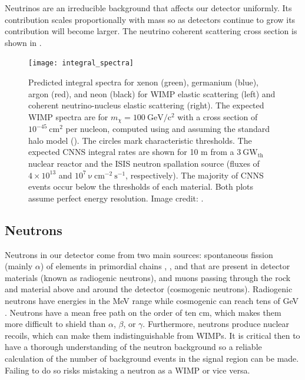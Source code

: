 Neutrinos are an irreducible background that affects our detector uniformly.  Its contribution scales proportionally with mass so as
detectors continue to grow its contribution will become larger.  The neutrino coherent scattering cross section is shown in
.

\begin{figure}
\centering
\texttt{[image: integral\_spectra]}
\caption{Predicted integral spectra for xenon (green), germanium (blue), argon (red), and neon (black) for WIMP elastic scattering (left)
and coherent neutrino-nucleus elastic scattering (right).  The expected WIMP spectra are for $m_{\chi} = 100\ \mathrm{GeV/c^2}$ with a
cross section of $10^{-45}\ \mathrm{cm^2}$ per nucleon, computed using  and assuming the standard halo model
().  The circles mark
characteristic thresholds.  The expected CNNS integral rates are shown for 10 m from a $3\ \mathrm{GW_{th}}$ nuclear
reactor and the ISIS neutron spallation source  (fluxes of
$4 \times 10^{13}$ and $10^{7}\ \mathrm{\nu\ cm^{-2}\ s^{-1}}$, respectively).  The majority of CNNS events occur below the
thresholds of each material.  Both plots assume perfect energy resolution.  Image credit:
.}
\label{fig:neutrinos_integral_spectra}
\end{figure}


\subsection{Neutrons}
\label{subsec:neutrons}
Neutrons in our detector come from two main sources: spontaneous fission (mainly $\alpha$) of elements in primordial chains
\uranium, , and  that are present in detector materials (known as radiogenic neutrons), and muons
passing through the rock and material above and around the detector (cosmogenic neutrons).  Radiogenic neutrons have energies in the MeV
range
while cosmogenic can reach tens of GeV .  Neutrons have a mean free path on the order of ten cm, which makes
them more difficult to shield than $\alpha$, $\beta$, or $\gamma$.  Furthermore, neutrons produce nuclear recoils, which can make
them indistinguishable from WIMPs.  It is critical then to have a thorough understanding of the neutron background so a reliable
calculation of the number of background events in the signal region can be made.  Failing to do so risks mistaking a neutron as a WIMP or
vice versa.

